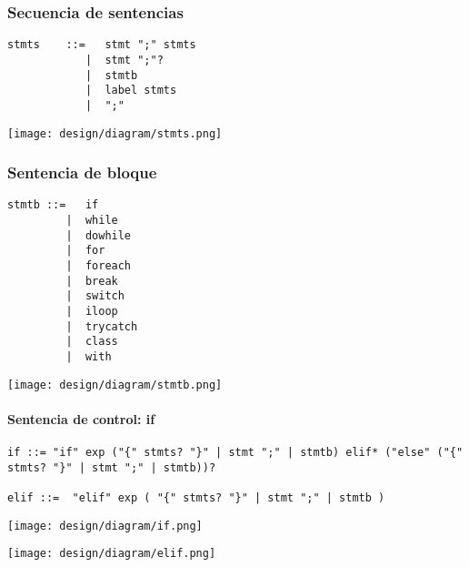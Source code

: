 \subsubsection{Secuencia de sentencias}
\begin{multicols}{2}
\begin{lstlisting}[style=nonumbers]
stmts    ::=   stmt ";" stmts
            |  stmt ";"?
            |  stmtb 
            |  label stmts
            |  ";"
\end{lstlisting}  	
\columnbreak
\begin{center}
\texttt{[image: design/diagram/stmts.png]} 
\end{center}
\end{multicols}

\subsubsection{Sentencia de bloque}
\begin{multicols}{2}
\begin{lstlisting}[style=nonumbers]
stmtb ::=   if
         |  while
         |  dowhile
         |  for
         |  foreach
         |  break
         |  switch
         |  iloop
         |  trycatch
         |  class
         |  with
\end{lstlisting}  	
\columnbreak
\begin{center}
\texttt{[image: design/diagram/stmtb.png]} 
\end{center}
\end{multicols}
\paragraph{Sentencia de control: if}
\begin{lstlisting}[style=nonumbers,
    basicstyle=\tiny, %or \small or \footnotesize etc.
]
if ::= "if" exp ("{" stmts? "}" | stmt ";" | stmtb) elif* ("else" ("{" stmts? "}" | stmt ";" | stmtb))?

elif ::=  "elif" exp ( "{" stmts? "}" | stmt ";" | stmtb ) 
\end{lstlisting}  	
\begin{center}
\texttt{[image: design/diagram/if.png]} 
\end{center}
\begin{center}
\texttt{[image: design/diagram/elif.png]} 
\end{center}

